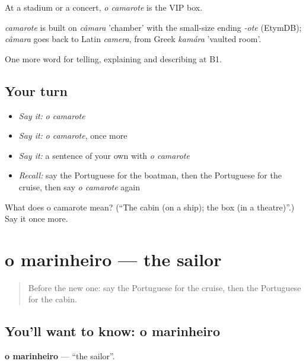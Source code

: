 At a stadium or a concert, \emph{o camarote} is the VIP box.

\begin{cousinweb}
\emph{camarote} is built on \emph{câmara} 'chamber' with the small-size ending \emph{-ote} (EtymDB); \emph{câmara} goes back to Latin \emph{camera}, from Greek \emph{kamára} 'vaulted room'.
\end{cousinweb}

\begin{grammarlens}[title={What you've built}]
One more word for telling, explaining and describing at B1.
\end{grammarlens}

\subsection*{Your turn}
\begin{itemize}
\raggedright
  \item \emph{Say it:} \emph{o camarote}
  \item \emph{Say it:} \emph{o camarote}, once more
  \item \emph{Say it:} a sentence of your own with \emph{o camarote}
  \item \emph{Recall:} say the Portuguese for the boatman, then the Portuguese for the cruise, then say \emph{o camarote} again
\end{itemize}

\begin{tcolorbox}[breakable,colback=teal!4,colframe=teal!35!black,title={Before you move on}]
What does o camarote mean? (\textquotedblleft{}The cabin (on a ship); the box (in a theatre)\textquotedblright{}.) Say it once more.
\end{tcolorbox}
\section[o marinheiro]{o marinheiro — the sailor}

\label{lesson:PT-C419-marinheiro}



\begin{quote}
Before the new one: say the Portuguese for the cruise, then the Portuguese for the cabin.
\end{quote}

\subsection*{You'll want to know: o marinheiro}
\textbf{o marinheiro} — \textquotedblleft{}the sailor\textquotedblright{}.

